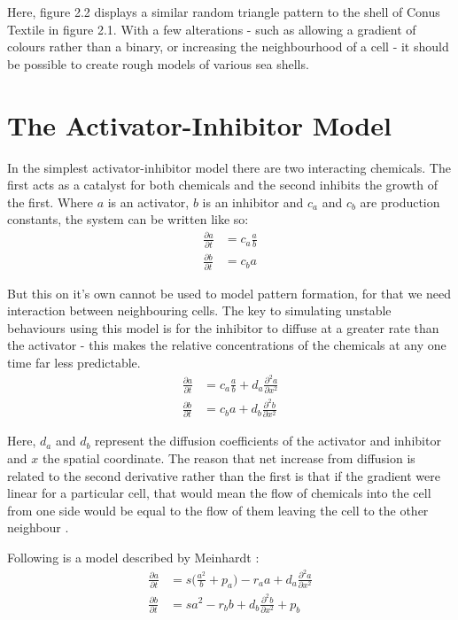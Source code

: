 \documentclass[a4paper,11pt]{report}
\begin{document}
Here, figure 2.2 displays a similar random triangle pattern to the shell of Conus Textile in figure 2.1. With a few alterations - such as allowing a gradient of colours rather than a binary, or increasing the neighbourhood of a cell - it should be possible to create rough models of various sea shells. 

\section{The Activator-Inhibitor Model}

In the simplest activator-inhibitor model there are two interacting chemicals. The first acts as a catalyst for both chemicals and the second inhibits the growth of the first. Where $a$ is an activator, $b$ is an inhibitor and $c_a$ and $c_b$ are production constants, the system can be written like so:
\begin{equation}
 \begin{align}
 \frac{\partial a}{\partial t} &= c_a\frac{a}{b} \\
 \frac{\partial b}{\partial t} &= c_b a
\end{align}
\end{equation}

But this on it's own cannot be used to model pattern formation, for that we need interaction between neighbouring cells. The key to simulating unstable behaviours using this model is for the inhibitor to diffuse at a greater rate than the activator - this makes the relative concentrations of the chemicals at any one time far less predictable.
\begin{equation}
 \begin{align}
 \frac{\partial a}{\partial t} &= c_a\frac{a}{b} + d_a\frac{\partial ^2 a}{\partial x^2} \\
 \frac{\partial b}{\partial t} &= c_b a + d_b\frac{\partial ^2 b}{\partial x^2}
\end{align}
\end{equation}

Here, $d_a$ and $d_b$ represent the diffusion coefficients of the activator and inhibitor and $x$ the spatial coordinate. The reason that net increase from diffusion is related to the second derivative rather than the first is that if the gradient were linear for a particular cell, that would mean the flow of chemicals into the cell from one side would be equal to the flow of them leaving the cell to the other neighbour \cite{seashells}.

Following is a model described by Meinhardt \cite[p. 23]{seashells}:
\begin{equation}
 \begin{align}
  \frac{\partial a}{\partial t} &= s\bigg(\frac{a^2}{b} + p_a\bigg) - r_a a + d_a\frac{\partial ^2 a}{\partial x^2} \\
  \frac{\partial b}{\partial t} &= sa^2 - r_b b + d_b\frac{\partial^2 b}{\partial x^2} + p_b
 \end{align}
 \label{meinhardt_eq}
\end{equation}
\end{document}

